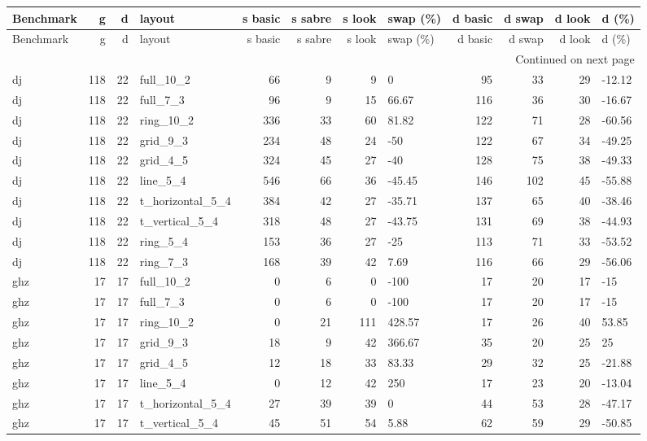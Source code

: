 \begin{longtable}{lrrlrrrlrrrl}
\toprule
Benchmark & g & d & layout & s basic & s sabre & s look & swap (\%) & d basic & d swap & d look & d (\%) \\
\midrule
\endfirsthead
\toprule
Benchmark & g & d & layout & s basic & s sabre & s look & swap (\%) & d basic & d swap & d look & d (\%) \\
\midrule
\endhead
\midrule
\multicolumn{12}{r}{Continued on next page} \\
\midrule
\endfoot
\bottomrule
\endlastfoot
dj & 118 & 22 & full\_10\_2 & 66 & 9 & 9 & 0 & 95 & 33 & 29 & -12.12 \\
dj & 118 & 22 & full\_7\_3 & 96 & 9 & 15 & 66.67 & 116 & 36 & 30 & -16.67 \\
dj & 118 & 22 & ring\_10\_2 & 336 & 33 & 60 & 81.82 & 122 & 71 & 28 & -60.56 \\
dj & 118 & 22 & grid\_9\_3 & 234 & 48 & 24 & -50 & 122 & 67 & 34 & -49.25 \\
dj & 118 & 22 & grid\_4\_5 & 324 & 45 & 27 & -40 & 128 & 75 & 38 & -49.33 \\
dj & 118 & 22 & line\_5\_4 & 546 & 66 & 36 & -45.45 & 146 & 102 & 45 & -55.88 \\
dj & 118 & 22 & t\_horizontal\_5\_4 & 384 & 42 & 27 & -35.71 & 137 & 65 & 40 & -38.46 \\
dj & 118 & 22 & t\_vertical\_5\_4 & 318 & 48 & 27 & -43.75 & 131 & 69 & 38 & -44.93 \\
dj & 118 & 22 & ring\_5\_4 & 153 & 36 & 27 & -25 & 113 & 71 & 33 & -53.52 \\
dj & 118 & 22 & ring\_7\_3 & 168 & 39 & 42 & 7.69 & 116 & 66 & 29 & -56.06 \\
ghz & 17 & 17 & full\_10\_2 & 0 & 6 & 0 & -100 & 17 & 20 & 17 & -15 \\
ghz & 17 & 17 & full\_7\_3 & 0 & 6 & 0 & -100 & 17 & 20 & 17 & -15 \\
ghz & 17 & 17 & ring\_10\_2 & 0 & 21 & 111 & 428.57 & 17 & 26 & 40 & 53.85 \\
ghz & 17 & 17 & grid\_9\_3 & 18 & 9 & 42 & 366.67 & 35 & 20 & 25 & 25 \\
ghz & 17 & 17 & grid\_4\_5 & 12 & 18 & 33 & 83.33 & 29 & 32 & 25 & -21.88 \\
ghz & 17 & 17 & line\_5\_4 & 0 & 12 & 42 & 250 & 17 & 23 & 20 & -13.04 \\
ghz & 17 & 17 & t\_horizontal\_5\_4 & 27 & 39 & 39 & 0 & 44 & 53 & 28 & -47.17 \\
ghz & 17 & 17 & t\_vertical\_5\_4 & 45 & 51 & 54 & 5.88 & 62 & 59 & 29 & -50.85 \\

\end{longtable}
